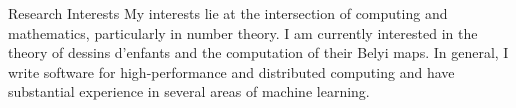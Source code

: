 \begin{rSection}{Research Interests}
My interests lie at the intersection of computing and mathematics, particularly in number theory. 
I am currently interested in the theory of dessins d'enfants and the computation of their Belyi maps. In general, I write software for high-performance and distributed computing and have substantial experience in several areas of machine learning.
\end{rSection}